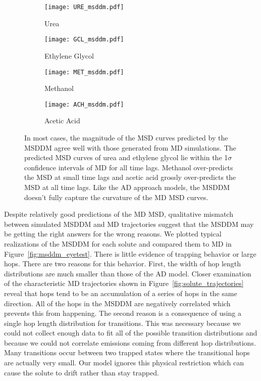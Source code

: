 \documentclass[journal=ancac3,manuscript=article,layout=twocolumn]{achemso}
\begin{document}
  \begin{figure*}
  \centering
  \begin{subfigure}{0.45\textwidth}
  \texttt{[image: URE\_msddm.pdf]}
  \caption{Urea}\label{fig:URE_msddm}
  \end{subfigure}
  \begin{subfigure}{0.45\textwidth}
  \texttt{[image: GCL\_msddm.pdf]}
  \caption{Ethylene Glycol}\label{fig:GCL_msddm}
  \end{subfigure}
  \begin{subfigure}{0.45\textwidth}
  \texttt{[image: MET\_msddm.pdf]}
  \caption{Methanol}\label{fig:MET_msddm}
  \end{subfigure}
  \begin{subfigure}{0.45\textwidth}
  \texttt{[image: ACH\_msddm.pdf]}
  \caption{Acetic Acid}\label{fig:ACH_msddm}
  \end{subfigure}
  \caption{In most cases, the magnitude of the MSD curves predicted by the
	  MSDDM agree well with those generated from MD simulations. The
	  predicted MSD curves of urea and ethylene glycol lie within the
	  1$\sigma$ confidence intervals of MD for all time lags. Methanol
	  over-predicts the MSD at small time lags and acetic acid grossly
	  over-predicts the MSD at all time lags.  Like the AD approach models,
	  the MSDDM doesn't fully capture the curvature of the MD MSD curves.
	  }\label{fig:msddm_performance}
  \end{figure*}
  
  Despite relatively good predictions of the MD MSD, qualitative mismatch
  between simulated MSDDM and MD trajectories suggest that the MSDDM may be
  getting the right answers for the wrong reasons. We plotted typical
  realizations of the MSDDM for each solute and compared them to MD in
  Figure~\ref{fig:msddm_eyetest}. There is little evidence of trapping behavior
  or large hops. There are two reasons for this behavior. First, the width of
  hop length distributions are much smaller than those of the AD model. Closer
  examination of the characteristic MD trajectories shown in
  Figure~\ref{fig:solute_trajectories} reveal that hops tend to be an
  accumulation of a series of hops in the same direction. All of the hops in
  the MSDDM are negatively correlated which prevents this from happening. The
  second reason is a consequence of using a single hop length distribution for
  transitions. This was necessary because we could not collect enough data to
  fit all of the possible transition distributions and because we could not
  correlate emissions coming from different hop distributions. Many
  transitions occur between two trapped states where the transitional hops are
  actually very small. Our model ignores this physical restriction which can
  cause the solute to drift rather than stay trapped.
  
\end{document}
